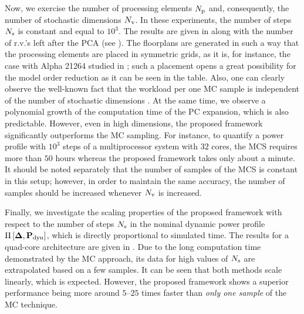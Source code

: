
Now, we exercise the number of processing elements ${N_\text{p}}$ and, consequently, the number of stochastic dimensions ${N_\text{v}}$. In these experiments, the number of steps $N_\text{s}$ is constant and equal to $10^3$. The results are given in  along with the number of r.v.'s left after the PCA (see ). The floorplans are generated in such a way that the processing elements are placed in symmetric grids, as it is, for instance, the case with Alpha 21264 studied in \cite{juan2011}; such a placement opens a great possibility for the model order reduction as it can be seen in the table. Also, one can clearly observe the well-known fact that the workload per one MC sample is independent of the number of stochastic dimensions \cite{maitre2010}. At the same time, we observe a polynomial growth \cite{heiss2008} of the computation time of the PC expansion, which is also predictable. However, even in high dimensions, the proposed framework significantly outperforms the MC sampling. For instance, to quantify a power profile with $10^3$ steps of a multiprocessor system with $32$ cores, the MCS requires more than $50$ hours whereas the proposed framework takes only about a minute. It should be noted separately that the number of samples of the MCS is constant in this setup; however, in order to maintain the same accuracy, the number of samples should be increased whenever ${N_\text{v}}$ is increased.


Finally, we investigate the scaling properties of the proposed framework with respect to the number of steps $N_\text{s}$ in the nominal dynamic power profile $\prof{\mP_\dyn}$, which is directly proportional to simulated time. The results for a quad-core architecture are given in . Due to the long computation time demonstrated by the MC approach, its data for high values of $N_\text{s}$ are extrapolated based on a few samples. It can be seen that both methods scale linearly, which is expected. However, the proposed framework shows a superior performance being more around $5$--$25$ times faster than \emph{only one sample} of the MC technique.
